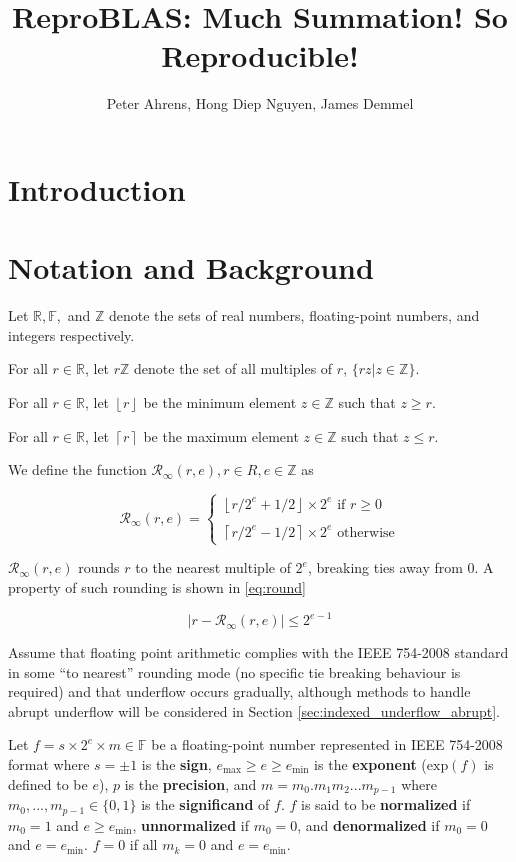 \documentclass[12pt]{article}
\author{Peter Ahrens, Hong Diep Nguyen, James Demmel}
\title{ReproBLAS: Much Summation! So Reproducible!}
\providecommand{\ceil}[1]{\left \lceil #1 \right \rceil }
\providecommand{\floor}[1]{\left \lfloor #1 \right \rfloor }
\providecommand{\R}{\ensuremath{\mathbb{R}}}
\providecommand{\F}{\ensuremath{\mathbb{F}}}
\providecommand{\Z}{\ensuremath{\mathbb{Z}}}
\providecommand{\exp}{\ensuremath{\text{exp}}}
\providecommand{\min}{\ensuremath{\text{min}}}
\providecommand{\max}{\ensuremath{\text{max}}}
\providecommand{\roundtonearestinfty}{\ensuremath{\mathcal{R}_\text{$\infty$}}}
\theoremstyle{definition}
\numberwithin{equation}{section}
\numberwithin{figure}{section}
\begin{document}
\noindent
\maketitle
\tableofcontents
\newpage
\section{Introduction}
\section{Notation and Background}
  Let $\R, \F, $ and $\Z$ denote the sets of real numbers, floating-point numbers, and integers respectively.

  For all $r \in \R$, let $r\Z$ denote the set of all multiples of $r$, $\{rz | z \in \Z\}$.

  For all $r \in \R$, let $\floor{r}$ be the minimum element $z \in \Z$ such that $z \geq r$.

  For all $r \in \R$, let $\ceil{r}$ be the maximum element $z \in \Z$ such that $z \leq r$.

  We define the function $\roundtonearestinfty(r, e), r \in R, e \in \Z$ as

  \begin{equation}
    \roundtonearestinfty(r, e) = \begin{cases}\floor{r/2^e + 1/2} \times 2^e \text{ if } r \geq 0\\ \\ \ceil{r/2^e - 1/2}\times 2^e \text{ otherwise}\end{cases}
  \end{equation}

  $\roundtonearestinfty(r, e)$ rounds $r$ to the nearest multiple of $2^e$, breaking ties away from 0. A property of such rounding is shown in  \eqref{eq:round}

  \begin{equation}
    |r - \roundtonearestinfty(r, e)| \leq 2^{e - 1}
    \label{eq:round}
  \end{equation}

  Assume that floating point arithmetic complies with the IEEE 754-2008 standard \cite{ieee754} in some ``to nearest'' rounding mode (no specific tie breaking behaviour is required) and that underflow occurs gradually, although methods to handle abrupt underflow will be considered in Section \ref{sec:indexed_underflow_abrupt}.

  Let $f = s \times 2^e \times m \in \F$ be a floating-point number represented in IEEE 754-2008 format \cite{ieee754} where $s = \pm 1$ is the \textbf{sign}, $e_{\max} \geq e \geq e_{\min}$ is the \textbf{exponent} ($\exp(f)$ is defined to be $e$), $p$ is the \textbf{precision}, and $m = m_0.m_1m_2...m_{p-1}$ where $m_0, ..., m_{p - 1} \in \{0, 1\}$ is the \textbf{significand} of $f$. $f$ is said to be \textbf{normalized} if $m_0 = 1$ and $e \geq e_{\min}$, \textbf{unnormalized} if $m_0 = 0$, and \textbf{denormalized} if $m_0 = 0$ and $e = e_{\min}$. $f = 0$ if all $m_k = 0$ and $e = e_{\min}$.
\end{document}
